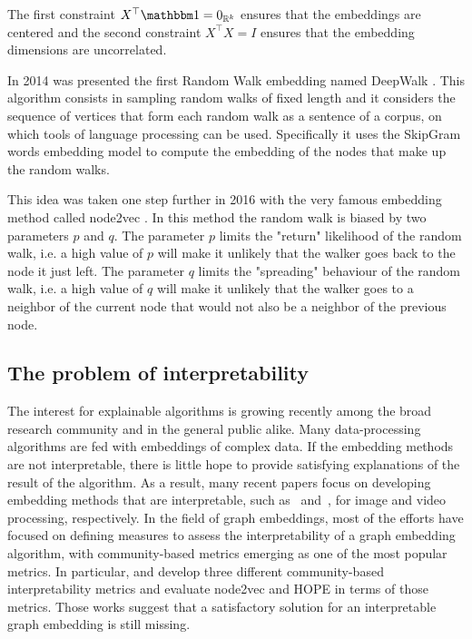 The first constraint $X^\top \ones = \zeros{\realset^k}$ ensures that the embeddings are centered and the second constraint $X^\top X = I$ ensures that the embedding dimensions are uncorrelated.

In 2014 was presented the first Random Walk embedding named DeepWalk \cite{perozzi2014_DeepWalkOnlineLearning}. This algorithm consists in sampling random walks of fixed length and it considers the sequence of vertices that form each random walk as a sentence of a corpus, on which tools of language processing can be used. Specifically it uses the SkipGram words embedding model to compute the embedding of the nodes that make up the random walks.

This idea was taken one step further in 2016 with the very famous embedding method called node2vec \cite{groverNode2vecScalableFeature2016}. In this method the random walk is biased by two parameters $p$ and $q$. The parameter $p$ limits the "return" likelihood of the random walk, i.e. a high value of $p$ will make it unlikely that the walker goes back to the node it just left. The parameter $q$ limits the "spreading" behaviour of the random walk, i.e. a high value of $q$ will make it unlikely that the walker goes to a neighbor of the current node that would not also be a neighbor of the previous node.



\subsection{The problem of interpretability}
The interest for explainable algorithms is growing recently among the broad research community and in the general public alike. Many data-processing algorithms are fed with embeddings of complex data. If the embedding methods are not interpretable, there is little hope to provide satisfying explanations of the result of the algorithm. As a result, many recent papers focus on developing embedding methods that are interpretable, such as~\cite{example_interpr_lee_2021} and~\cite{example_interpr_wu_2020}, for image and video processing, respectively.
In the field of graph embeddings, most of the efforts have focused on defining measures to assess the interpretability of a graph embedding algorithm, with community-based metrics emerging as one of the most popular metrics. In particular, \cite{khoshraftar2021} and \cite{gogoglou_2019} develop three different community-based interpretability metrics and evaluate node2vec and HOPE in terms of those metrics. Those works suggest that a satisfactory solution for an interpretable graph embedding is still missing. %

